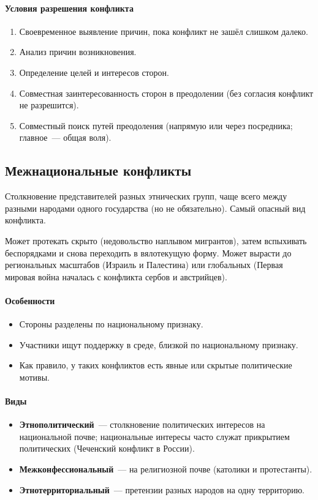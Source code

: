 \documentclass[12pt]{article}
\begin{document}
	\paragraph{Условия разрешения конфликта}
	\begin{enumerate}
		\item Своевременное выявление причин, пока конфликт не зашёл слишком далеко.
		\item Анализ причин возникновения.
		\item Определение целей и интересов сторон.
		\item Совместная заинтересованность сторон в преодолении (без согласия конфликт не разрешится).
		\item Совместный поиск путей преодоления (напрямую или через посредника; главное~--- общая воля).
	\end{enumerate}

	\subsection{Межнациональные конфликты}

	\begin{definition}
		Столкновение представителей разных этнических групп, чаще всего между разными народами одного государства (но не обязательно). Самый опасный вид конфликта.
	\end{definition}

	Может протекать скрыто (недовольство наплывом мигрантов), затем вспыхивать беспорядками и снова переходить в вялотекущую форму. Может вырасти до региональных масштабов (Израиль и Палестина) или глобальных (Первая мировая война началась с конфликта сербов и австрийцев).

	\paragraph{Особенности}
	\begin{itemize}
		\item Стороны разделены по национальному признаку.
		\item Участники ищут поддержку в среде, близкой по национальному признаку.
		\item Как правило, у таких конфликтов есть явные или скрытые политические мотивы.
	\end{itemize}

	\paragraph{Виды}
	\begin{itemize}
		\item \textbf{Этнополитический}~--- столкновение политических интересов на национальной почве; национальные интересы часто служат прикрытием политических (Чеченский конфликт в России).
		\item \textbf{Межконфессиональный}~--- на религиозной почве (католики и протестанты).
		\item \textbf{Этнотерриториальный}~--- претензии разных народов на одну территорию.
	\end{itemize}
\end{document}
